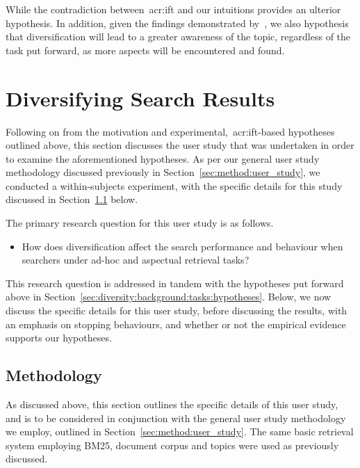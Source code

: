 While the contradiction between~\gls{acr:ift} and our intuitions provides an ulterior hypothesis. In addition, given the findings demonstrated by~\cite{syed2017sal}, we also hypothesis that diversification will lead to a greater awareness of the topic, regardless of the task put forward, as more aspects will be encountered and found.

\section{Diversifying Search Results}\label{sec:diversity:users}
Following on from the motivation and experimental,~\gls{acr:ift}-based hypotheses outlined above, this section discusses the user study that was undertaken in order to examine the aforementioned hypotheses. As per our general user study methodology discussed previously in Section~\ref{sec:method:user_study}, we conducted a within-subjects experiment, with the specific details for this study discussed in Section~\ref{sec:diversity:users:method} below.

The primary research question for this user study is as follows.

\begin{itemize}
    \item{ How does diversification affect the search performance and behaviour when searchers under ad-hoc and aspectual retrieval tasks?}
\end{itemize}

This research question is addressed in tandem with the hypotheses put forward above in Section~\ref{sec:diversity:background:tasks:hypotheses}. Below, we now discuss the specific details for this user study, before discussing the results, with an emphasis on stopping behaviours, and whether or not the empirical evidence supports our hypotheses.

\subsection{Methodology}\label{sec:diversity:users:method}
As discussed above, this section outlines the specific details of this user study, and is to be considered in conjunction with the general user study methodology we employ, outlined in Section~\ref{sec:method:user_study}. The same basic retrieval system employing BM25, document corpus and topics were used as previously discussed.

